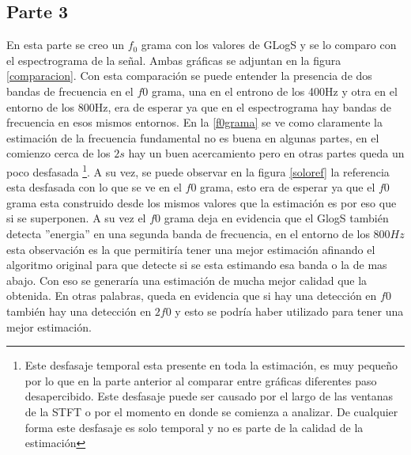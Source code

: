 \documentclass[a4paper]{article}
\begin{document}
\subsection{Parte 3}
En esta parte se creo un $f_0$ grama con los valores de GLogS y se lo comparo con el espectrograma de la señal. Ambas gráficas se adjuntan en la figura \ref{comparacion}. Con esta comparación se puede entender la presencia de dos bandas de frecuencia en el $f0$ grama, una en el entrono de los 400Hz y otra en el entorno de los 800Hz, era de esperar ya que en el espectrograma hay bandas de frecuencia en esos mismos entornos. En la \ref{f0grama} se ve como claramente la estimación de la frecuencia fundamental no es buena en algunas partes, en el comienzo cerca de los $2s$ hay un buen acercamiento pero en otras partes queda un poco desfasada \footnote{Este desfasaje temporal esta presente en toda la estimación, es muy pequeño por lo que en la parte anterior al comparar entre gráficas diferentes paso desapercibido. Este desfasaje puede ser causado por el largo de las ventanas de la STFT o por el momento en donde se comienza a analizar. De cualquier forma este desfasaje es solo temporal y no es parte de la calidad de la estimación}. A su vez, se puede observar en la figura \ref{soloref} la referencia esta desfasada con lo que se ve en el $f0$ grama, esto era de esperar ya que el $f0$ grama esta construido desde los mismos valores que la estimación es por eso que si se superponen. A su vez el $f0$ grama deja en evidencia que el GlogS también detecta ''energia'' en una segunda banda de frecuencia, en el entorno de los $800Hz$ esta observación es la que permitiría tener una mejor estimación afinando el algoritmo original para que detecte si se esta estimando esa banda o la de mas abajo. Con eso se generaría una estimación de mucha mejor calidad que la obtenida. En otras palabras, queda en evidencia que si hay una detección en $f0$ también hay una detección en $2f0$ y esto se podría haber utilizado para tener una mejor estimación.
\end{document}
